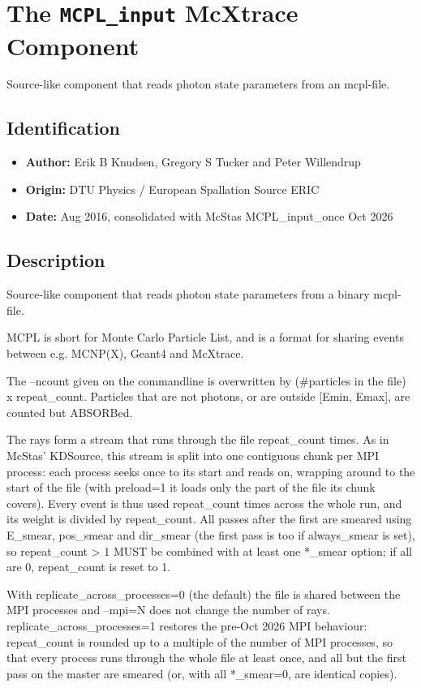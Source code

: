 \section{The \texttt{MCPL\_input} McXtrace Component}
Source-like component that reads photon state parameters from an mcpl-file.

\subsection*{Identification}
\begin{itemize}
  \item \textbf{Author:} Erik B Knudsen, Gregory S Tucker and Peter Willendrup
  \item \textbf{Origin:} DTU Physics / European Spallation Source ERIC
  \item \textbf{Date:} Aug 2016, consolidated with McStas MCPL\_input\_once Oct 2026
\end{itemize}

\subsection*{Description}
Source-like component that reads photon state parameters from a binary mcpl-file.

MCPL is short for Monte Carlo Particle List, and is a format for sharing events between e.g. MCNP(X), Geant4 and McXtrace.

The --ncount given on the commandline is overwritten by (\#particles in the file) x repeat\_count. Particles that are not photons, or are outside [Emin, Emax], are counted but ABSORBed.

The rays form a stream that runs through the file repeat\_count times. As in McStas' KDSource, this stream is split into one contiguous chunk per MPI process: each process seeks once to its start and reads on, wrapping around to the start of the file (with preload=1 it loads only the part of the file its chunk covers). Every event is thus used repeat\_count times across the whole run, and its weight is divided by repeat\_count. All passes after the first are smeared using E\_smear, pos\_smear and dir\_smear (the first pass is too if always\_smear is set), so repeat\_count \textgreater{} 1 MUST be combined with at least one *\_smear option; if all are 0, repeat\_count is reset to 1.

With replicate\_across\_processes=0 (the default) the file is shared between the MPI processes and --mpi=N does not change the number of rays. replicate\_across\_processes=1 restores the pre-Oct 2026 MPI behaviour: repeat\_count is rounded up to a multiple of the number of MPI processes, so that every process runs through the whole file at least once, and all but the first pass on the master are smeared (or, with all *\_smear=0, are identical copies).

